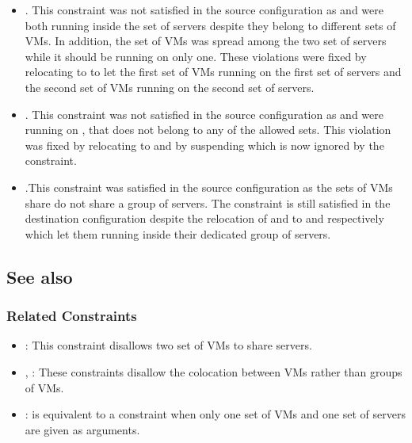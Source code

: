 \begin{itemize}

\item {}. This constraint was not satisfied in the source configuration as  and  were both running inside the set of servers  despite they belong to different sets of VMs. In addition, the set of VMs  was spread among the two set of servers while it should be running on only one. These violations were fixed by relocating  to  to let the first set of VMs running on the first set of servers and the second set of VMs running on the second set of servers.

\item {}. This constraint was not satisfied in the source configuration as  and  were running on , that does not belong to any of the allowed sets.  This violation was fixed by relocating  to  and by suspending  which is now ignored by the constraint.

\item {}.This constraint was satisfied in the source configuration as the sets of VMs share do not share a group of servers. The constraint is still satisfied in the destination configuration despite the relocation of  and  to  and  respectively which let them running inside their dedicated group of servers.

\end{itemize}

\subsection{See also}

\subsubsection{Related Constraints}
\begin{itemize}
\item {}: This constraint disallows two set of VMs to share servers.
\item {}, : These constraints disallow the colocation between VMs rather than groups of VMs.
\item {}:  is equivalent to a  constraint when only one set of VMs and one set of servers are given as arguments.

\end{itemize}

